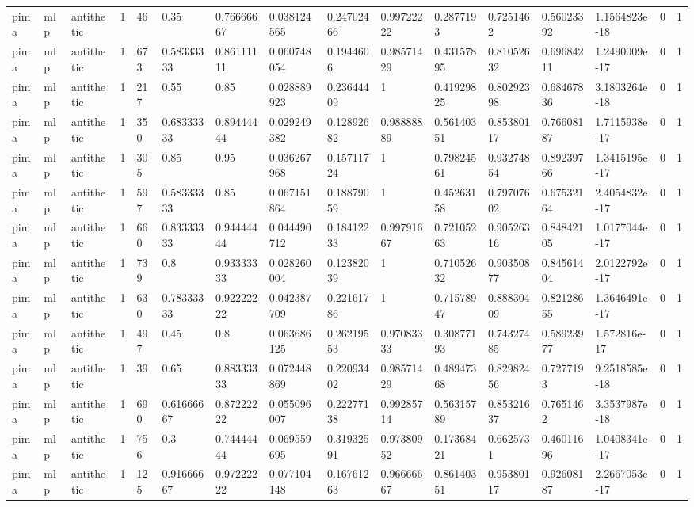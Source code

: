 \begin{tabular}{llllllllllllllll}
pima & mlp & antithetic & 1 & 46 & 0.35 & 0.76666667 & 0.038124565 & 0.24702466 & 0.99722222 & 0.2877193 & 0.7251462 & 0.56023392 & 1.1564823e-18 & 0 & 1 \\
pima & mlp & antithetic & 1 & 673 & 0.58333333 & 0.86111111 & 0.060748054 & 0.1944606 & 0.98571429 & 0.43157895 & 0.81052632 & 0.69684211 & 1.2490009e-17 & 0 & 1 \\
pima & mlp & antithetic & 1 & 217 & 0.55 & 0.85 & 0.028889923 & 0.23644409 & 1 & 0.41929825 & 0.80292398 & 0.68467836 & 3.1803264e-18 & 0 & 1 \\
pima & mlp & antithetic & 1 & 350 & 0.68333333 & 0.89444444 & 0.029249382 & 0.12892682 & 0.98888889 & 0.56140351 & 0.85380117 & 0.76608187 & 1.7115938e-17 & 0 & 1 \\
pima & mlp & antithetic & 1 & 305 & 0.85 & 0.95 & 0.036267968 & 0.15711724 & 1 & 0.79824561 & 0.93274854 & 0.89239766 & 1.3415195e-17 & 0 & 1 \\
pima & mlp & antithetic & 1 & 597 & 0.58333333 & 0.85 & 0.067151864 & 0.18879059 & 1 & 0.45263158 & 0.79707602 & 0.67532164 & 2.4054832e-17 & 0 & 1 \\
pima & mlp & antithetic & 1 & 660 & 0.83333333 & 0.94444444 & 0.044490712 & 0.18412233 & 0.99791667 & 0.72105263 & 0.90526316 & 0.84842105 & 1.0177044e-17 & 0 & 1 \\
pima & mlp & antithetic & 1 & 739 & 0.8 & 0.93333333 & 0.028260004 & 0.12382039 & 1 & 0.71052632 & 0.90350877 & 0.84561404 & 2.0122792e-17 & 0 & 1 \\
pima & mlp & antithetic & 1 & 630 & 0.78333333 & 0.92222222 & 0.042387709 & 0.22161786 & 1 & 0.71578947 & 0.88830409 & 0.82128655 & 1.3646491e-17 & 0 & 1 \\
pima & mlp & antithetic & 1 & 497 & 0.45 & 0.8 & 0.063686125 & 0.26219553 & 0.97083333 & 0.30877193 & 0.74327485 & 0.58923977 & 1.572816e-17 & 0 & 1 \\
pima & mlp & antithetic & 1 & 39 & 0.65 & 0.88333333 & 0.072448869 & 0.22093402 & 0.98571429 & 0.48947368 & 0.82982456 & 0.7277193 & 9.2518585e-18 & 0 & 1 \\
pima & mlp & antithetic & 1 & 690 & 0.61666667 & 0.87222222 & 0.055096007 & 0.22277138 & 0.99285714 & 0.56315789 & 0.85321637 & 0.7651462 & 3.3537987e-18 & 0 & 1 \\
pima & mlp & antithetic & 1 & 756 & 0.3 & 0.74444444 & 0.069559695 & 0.31932591 & 0.97380952 & 0.17368421 & 0.6625731 & 0.46011696 & 1.0408341e-17 & 0 & 1 \\
pima & mlp & antithetic & 1 & 125 & 0.91666667 & 0.97222222 & 0.077104148 & 0.16761263 & 0.96666667 & 0.86140351 & 0.95380117 & 0.92608187 & 2.2667053e-17 & 0 & 1 \\

\end{tabular}
